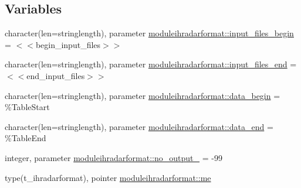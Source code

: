 \subsection*{Variables}
\begin{DoxyCompactItemize}
\item 
character(len=stringlength), parameter \mbox{\hyperlink{namespacemoduleihradarformat_a872caa24e241015b723a32676f702a85}{moduleihradarformat\+::input\+\_\+files\+\_\+begin}} = \textquotesingle{}$<$$<$begin\+\_\+input\+\_\+files$>$$>$\textquotesingle{}
\item 
character(len=stringlength), parameter \mbox{\hyperlink{namespacemoduleihradarformat_a725e820b1ca4be9c91c2e636da468f27}{moduleihradarformat\+::input\+\_\+files\+\_\+end}} = \textquotesingle{}$<$$<$end\+\_\+input\+\_\+files$>$$>$\textquotesingle{}
\item 
character(len=stringlength), parameter \mbox{\hyperlink{namespacemoduleihradarformat_a0280cbcdc12bde5023d64c330dec8291}{moduleihradarformat\+::data\+\_\+begin}} = \textquotesingle{}\%Table\+Start\textquotesingle{}
\item 
character(len=stringlength), parameter \mbox{\hyperlink{namespacemoduleihradarformat_a6c10206edf04ac8656a295f742f82063}{moduleihradarformat\+::data\+\_\+end}} = \textquotesingle{}\%Table\+End\textquotesingle{}
\item 
integer, parameter \mbox{\hyperlink{namespacemoduleihradarformat_ae0ba5f7cd624c09fd6bc98d96abb6fb6}{moduleihradarformat\+::no\+\_\+output\+\_\+}} = -\/99
\item 
type(t\+\_\+ihradarformat), pointer \mbox{\hyperlink{namespacemoduleihradarformat_a14fd264aff99a0e5a137305aada23b50}{moduleihradarformat\+::me}}
\end{DoxyCompactItemize}
